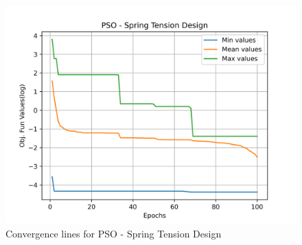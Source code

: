 \begin{figure}[H]
        \centering
        \caption{Convergence lines for PSO - Spring Tension Design}
        \label{fig:spring_problem_solve_pso}
        \includegraphics[scale=0.5]{images/spring_problem_solve_pso.png}
        \end{figure}
        